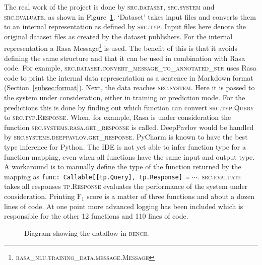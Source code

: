 The real work of the project is done by \textsc{src.dataset}, \textsc{src.system} and \textsc{src.evaluate}, as shown in Figure~\ref{fig:flowchart}.
`Dataset' takes input files and converts them to an internal representation as defined by \textsc{src.typ}.
Input files here denote the original dataset files as created by the dataset publishers.
For the internal representation a Rasa Message\footnote{\textsc{rasa\_nlu.training\_data.message.Message}} is used.
The benefit of this is that it avoids defining the same structure and that it can be used in combination with Rasa code.
For example, \textsc{src.dataset.convert\_message\_to\_annotated\_str} uses Rasa code to print the internal data representation as a sentence in Markdown format (Section~\ref{subsec:format}).
Next, the data reaches \textsc{src.system}.
Here it is passed to the system under consideration, either in training or prediction mode.
For the predictions this is done by finding out which function can convert \textsc{src.typ.Query} to \textsc{src.typ.Response}.
When, for example, Rasa is under consideration the function \textsc{src.systems.rasa.get\_response} is called.
DeepPavlov would be handled by \textsc{src.systems.deeppavlov.get\_response}.
PyCharm is known to have the best type inference for Python.
The IDE is not yet able to infer function type for a function mapping, even when all functions have the same input and output type.
A workaround is to manually define the type of the function returned by the mapping as \verb|func: Callable[[tp.Query], tp.Response] =| $\cdots$.
\textsc{src.evaluate} takes all responses \textsc{tp.Response} evaluates the performance of the system under consideration.
Printing $\text{F}_1$ score is a matter of three functions and about a dozen lines of code.
At one point more advanced logging has been included which is responsible for the other 12 functions and 110 lines of code.

\begin{figure}[htbp]
    \centering
    \caption{Diagram showing the dataflow in \textsc{bench}.}
    \label{fig:flowchart}
\end{figure}

